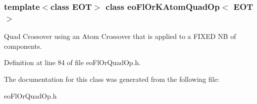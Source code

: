 \subsubsection*{template$<$class EOT$>$ class eo\-Fl\-Or\-KAtom\-Quad\-Op$<$ EOT $>$}

Quad Crossover using an Atom Crossover that is applied to a FIXED NB of components. 



Definition at line 84 of file eo\-Fl\-Or\-Quad\-Op.h.

The documentation for this class was generated from the following file:\begin{CompactItemize}
\item 
eo\-Fl\-Or\-Quad\-Op.h\end{CompactItemize}
